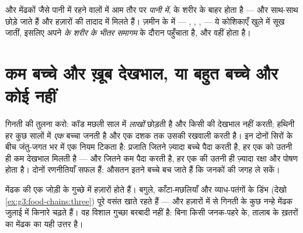 \begin{proposition}[निषेचन कहाँ होता है]\label{prop:g4:animal-reproduction:where}
 और मेंढकों जैसे पानी में रहने वालों में  आम तौर पर
\emph{पानी में},  के शरीर के बाहर होता है ---  और 
साथ-साथ छोड़े जाते हैं और हज़ारों की तादाद में मिलते हैं। ज़मीन के
 में --- , , ,  --- ये कोशिकाएँ खुले में
सूख जातीं, इसलिए  अपने  \emph{ के शरीर के भीतर}
\emph{समागम} के दौरान पहुँचाता है, और  वहीं होता
है।
\end{proposition}
\admitted

\section{कम बच्चे और ख़ूब देखभाल, या बहुत बच्चे और कोई नहीं}

\begin{proposition}\label{prop:g4:animal-reproduction:strategies}
गिनती की तुलना करो: कॉड मछली साल में \emph{लाखों}  छोड़ती है और
किसी की देखभाल नहीं करती; हथिनी हर कुछ सालों में \emph{एक} बच्चा जनती
है और एक दशक तक उसकी रखवाली करती है। इन दोनों सिरों के बीच जंतु-जगत भर
में एक नियम टिकता है: प्रजाति जितने ज़्यादा बच्चे पैदा करती है, हर एक
को उतनी ही कम देखभाल मिलती है --- और जितने कम पैदा करती है, हर एक की
उतनी ही ज़्यादा रक्षा और पोषण होता है। दोनों रणनीतियाँ सफल हैं: औसतन
इतने बच्चे बच जाते हैं कि जनकों की जगह ले सकें।
\end{proposition}
\admitted

\begin{example}[तालाब की गिनती]\label{ex:g4:animal-reproduction:pondcount}
मेंढक की एक जोड़ी के गुच्छे में हज़ारों  होते हैं। बगुले,
काँटा-मछलियाँ और व्याध-पतंगों के डिंभ (देखो
\cref{ex:g3:food-chains:three}) पूरे वसंत  खाते रहते हैं ---
और हज़ारों में से गिनती के कुछ नन्हे मेंढक जुलाई में किनारे चढ़ते हैं।
वह विशाल गुच्छा बरबादी नहीं है: बिना किसी जनक-पहरे के, तालाब के ख़तरों
का मेंढक का यही उत्तर है।
\end{example}

